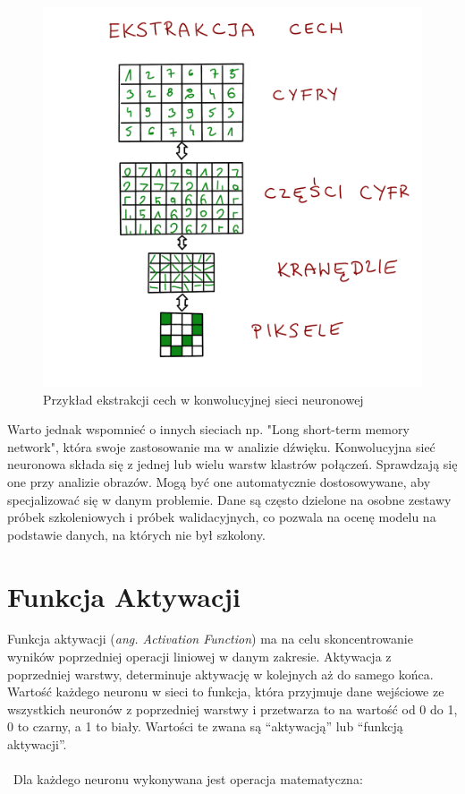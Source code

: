 \documentclass[openright]{xmgr}
\begin{document}
\begin{figure}[!tbh]
\centering
\includegraphics[width=.8\hsize]{fig/10}
\caption{Przykład ekstrakcji cech w konwolucyjnej sieci neuronowej\label{RYS.2}}
\end{figure}

Warto jednak wspomnieć o innych sieciach np. "Long short-term memory network", która swoje zastosowanie ma w analizie dźwięku. Konwolucyjna sieć neuronowa składa się z jednej lub wielu warstw klastrów połączeń. Sprawdzają się one przy analizie obrazów.  Mogą być one automatycznie dostosowywane, aby specjalizować się w danym problemie. Dane są często dzielone na osobne zestawy próbek szkoleniowych i próbek walidacyjnych, co pozwala na ocenę modelu na podstawie danych, na których nie był szkolony.





\section{Funkcja Aktywacji  \label{s:dsssl}}

\indent \indent Funkcja aktywacji  (\textit{ang. Activation Function}) ma na celu skoncentrowanie wyników poprzedniej operacji liniowej w danym zakresie.
Aktywacja z poprzedniej warstwy, determinuje aktywację w kolejnych aż do samego końca. Wartość każdego neuronu w sieci to funkcja, która przyjmuje dane wejściowe ze wszystkich neuronów z poprzedniej warstwy i przetwarza to na wartość od 0 do 1, 0 to czarny, a 1 to biały. Wartości te zwana są “aktywacją” lub “funkcją aktywacji”. \\\\\ Dla każdego neuronu wykonywana jest operacja matematyczna:
\end{document}
